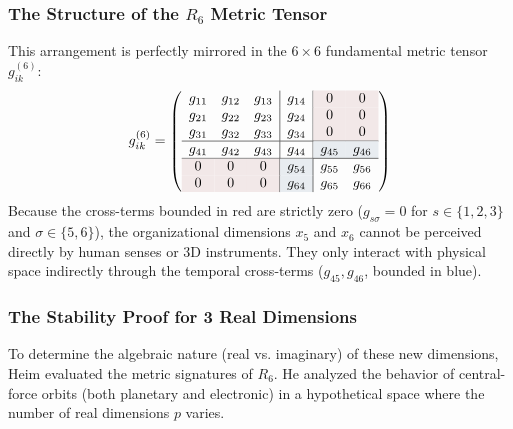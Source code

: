 \documentclass[11pt,a4paper,oneside]{article}
\begin{document}
\subsubsection{The Structure of the \texorpdfstring{$R_6$}{R6} Metric Tensor}
This arrangement is perfectly mirrored in the $6 \times 6$ fundamental metric tensor $g_{ik}^{(6)}$:
\begin{equation}
    g_{ik}^{(6)} = \left(
    \begin{array}{ccc|c|cc}
    g_{11} & g_{12} & g_{13} & g_{14} & \cellcolor{theoryred!10}0 & \cellcolor{theoryred!10}0 \\
    g_{21} & g_{22} & g_{23} & g_{24} & \cellcolor{theoryred!10}0 & \cellcolor{theoryred!10}0 \\
    g_{31} & g_{32} & g_{33} & g_{34} & \cellcolor{theoryred!10}0 & \cellcolor{theoryred!10}0 \\ \hline
    g_{41} & g_{42} & g_{43} & g_{44} & \cellcolor{theoryblue!10}g_{45} & \cellcolor{theoryblue!10}g_{46} \\ \hline
    \cellcolor{theoryred!10}0 & \cellcolor{theoryred!10}0 & \cellcolor{theoryred!10}0 & \cellcolor{theoryblue!10}g_{54} & g_{55} & g_{56} \\
    \cellcolor{theoryred!10}0 & \cellcolor{theoryred!10}0 & \cellcolor{theoryred!10}0 & \cellcolor{theoryblue!10}g_{64} & g_{65} & g_{66} \\
    \end{array}
    \right)
\end{equation}
Because the cross-terms bounded in red are strictly zero ($g_{s\sigma} = 0$ for $s \in \{1,2,3\}$ and $\sigma \in \{5,6\}$), the organizational dimensions $x_5$ and $x_6$ cannot be perceived directly by human senses or 3D instruments. They only interact with physical space indirectly through the temporal cross-terms ($g_{45}, g_{46}$, bounded in blue).

\subsubsection{The Stability Proof for 3 Real Dimensions}
To determine the algebraic nature (real vs. imaginary) of these new dimensions, Heim evaluated the metric signatures of $R_6$. He analyzed the behavior of central-force orbits (both planetary and electronic) in a hypothetical space where the number of real dimensions $p$ varies.
\end{document}
